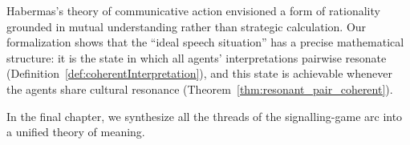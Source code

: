 Habermas's theory of communicative action envisioned a form of rationality
grounded in mutual understanding rather than strategic calculation.  Our
formalization shows that the ``ideal speech situation'' has a precise
mathematical structure: it is the state in which all agents' interpretations
pairwise resonate (Definition~\ref{def:coherentInterpretation}), and this
state is achievable whenever the agents share cultural resonance
(Theorem~\ref{thm:resonant_pair_coherent}).

In the final chapter, we synthesize all the threads of the signalling-game
arc into a unified theory of meaning.
